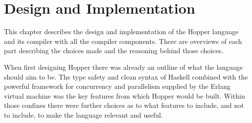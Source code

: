 \chapter{Design and Implementation}


This chapter describes the design and implementation of the Hopper language and its compiler with all the compiler components. There are overviews of each part describing the choices made and the reasoning behind those choices.

When first designing Hopper there was already an outline of what the language should aim to be. The type safety and clean syntax of Haskell combined with the powerful framework for concurrency and parallelism supplied by the Erlang virtual machine was the key features from which Hopper would be built. Within those confines there were further choices as to what features to include, and not to include, to make the language relevant and useful.






